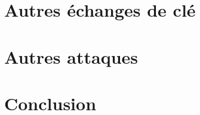 \documentclass{mpg-ep-slides}
\begin{document}
\section[Échanges]{Autres échanges de clé}
\tocsect


\section[Attaques]{Autres attaques}
\tocsect


\section{Conclusion}
\tocsect

\end{document}
